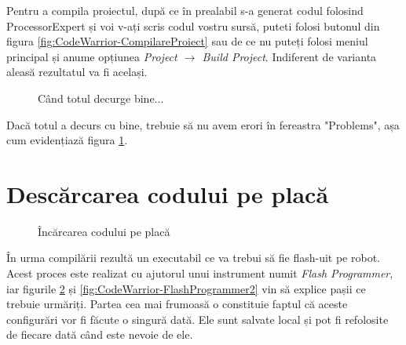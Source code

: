Pentru a compila proiectul, după ce în prealabil s-a generat codul folosind ProcessorExpert și voi v-ați scris codul vostru sursă, puteti folosi butonul din figura \ref{fig:CodeWarrior-CompilareProiect} sau de ce nu puteți folosi meniul principal și anume opțiunea \textit{Project $\rightarrow$ Build Project}. Indiferent de varianta aleasă rezultatul va fi același.

\begin{figure}
  \vspace{-20pt}
  \vspace{-15pt}
  \caption{\label{fig:CodeWarrior-FereastraProblems} Când totul decurge bine...}
  \vspace{-20pt}
\end{figure}

Dacă totul a decurs cu bine, trebuie să nu avem erori în fereastra "Problems", așa cum evidențiază figura \ref{fig:CodeWarrior-FereastraProblems}.

\section{Descărcarea codului pe placă}

\begin{figure}
  \vspace{-20pt}
  \vspace{-15pt}
  \caption{\label{fig:CodeWarrior-FlashProgrammer1} Încărcarea codului pe placă}
  \vspace{-20pt}
\end{figure}

În urma compilării rezultă un executabil ce va trebui să fie flash-uit pe robot. Acest proces este realizat cu ajutorul unui instrument numit \textit{Flash Programmer}, iar figurile \ref{fig:CodeWarrior-FlashProgrammer1} și \ref{fig:CodeWarrior-FlashProgrammer2} vin să explice pașii ce trebuie urmăriți. Partea cea mai frumoasă o constituie faptul că aceste configurări vor fi făcute o singură dată. Ele sunt salvate local și pot fi refolosite de fiecare dată când este nevoie de ele.


